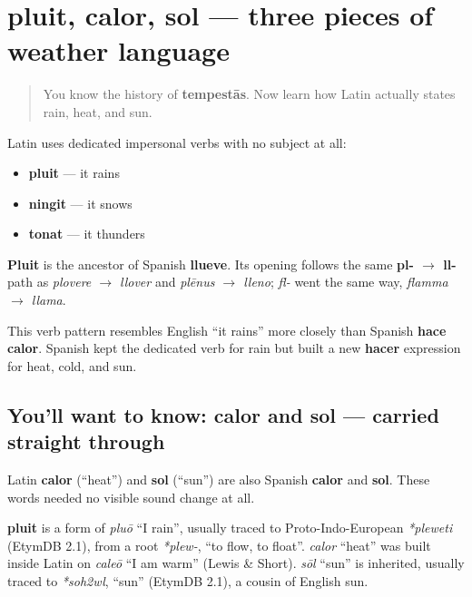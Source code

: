 \section[pluit, calor, sol]{pluit, calor, sol — three pieces of weather language}

\label{lesson:LA-C15-weather-verbs}



\begin{quote}
You know the history of \textbf{tempestās}. Now learn how Latin actually states rain, heat, and sun.
\end{quote}

\begin{grammarlens}[title={Grammar Lens: pluit — a subjectless weather verb}]
Latin uses dedicated impersonal verbs with no subject at all:

\begin{itemize}
\raggedright
  \item \textbf{pluit} — it rains
  \item \textbf{ningit} — it snows
  \item \textbf{tonat} — it thunders
\end{itemize}

\textbf{Pluit} is the ancestor of Spanish \textbf{llueve}. Its opening follows the same \textbf{pl- $\to$ ll-} path as \emph{plovere $\to$ llover} and \emph{plēnus $\to$ lleno}; \emph{fl-} went the same way, \emph{flamma $\to$ llama}.

This verb pattern resembles English \textquotedblleft{}it rains\textquotedblright{} more closely than Spanish \textbf{hace calor}. Spanish kept the dedicated verb for rain but built a new \textbf{hacer} expression for heat, cold, and sun.
\end{grammarlens}

\subsection*{You'll want to know: calor and sol — carried straight through}
Latin \textbf{calor} (\textquotedblleft{}heat\textquotedblright{}) and \textbf{sol} (\textquotedblleft{}sun\textquotedblright{}) are also Spanish \textbf{calor} and \textbf{sol}. These words needed no visible sound change at all.

\begin{cousinweb}
\textbf{pluit} is a form of \emph{pluō} \textquotedblleft{}I rain\textquotedblright{}, usually traced to Proto-Indo-European \emph{*pleweti} (EtymDB 2.1), from a root \emph{*plew-}, \textquotedblleft{}to flow, to float\textquotedblright{}. \emph{calor} \textquotedblleft{}heat\textquotedblright{} was built inside Latin on \emph{caleō} \textquotedblleft{}I am warm\textquotedblright{} (Lewis \& Short). \emph{sōl} \textquotedblleft{}sun\textquotedblright{} is inherited, usually traced to \emph{*soh2wl}, \textquotedblleft{}sun\textquotedblright{} (EtymDB 2.1), a cousin of English sun.
\end{cousinweb}

